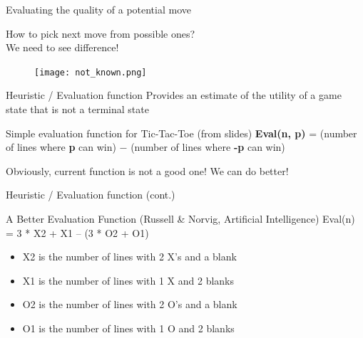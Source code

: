\documentclass[aspectratio=169]{beamer}
\begin{document}
\begin{frame}{Evaluating the quality of a potential move}

How to pick next move from possible ones? \\
We need to see difference! 
\begin{figure}
	\texttt{[image: not\_known.png]}	
\end{figure}
\end{frame}

\begin{frame}{Heuristic / Evaluation function}
Provides an estimate of the utility of a game state that is
not a terminal state
\begin{block}{Simple evaluation function for Tic-Tac-Toe (from slides)}
\textbf{Eval(n, p)} = (number of lines where \textbf{p} can win) $-$ (number of lines where \textbf{-p} can win)
\end{block}

\pause
 Obviously, current function is not a good one! We can do better!
\end{frame}



\begin{frame}{Heuristic / Evaluation function (cont.)}

\begin{block}{A Better Evaluation Function   (Russell \& Norvig, Artificial Intelligence)}
Eval(n) = 3 * X2 + X1 – (3 * O2 + O1) \\

\begin{itemize}
 \item X2 is the number of lines with 2 X’s and a blank
 \item X1 is the number of lines with 1 X and 2 blanks
 \item O2 is the number of lines with 2 O’s and a blank
 \item O1 is the number of lines with 1 O and 2 blanks 
\end{itemize}

\end{block}

\end{frame}
\end{document}

